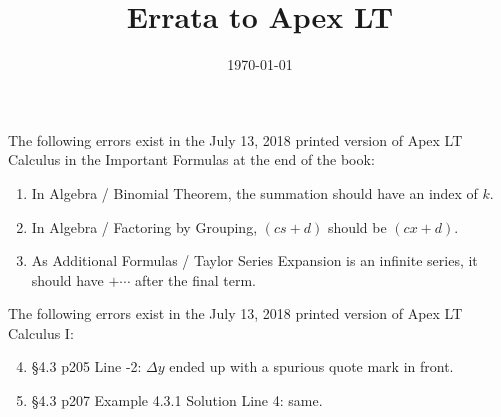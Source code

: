 \documentclass{amsart}
\title{Errata to Apex LT}
\date{\today}
\begin{document}
\vspace*{-.5in}

\maketitle

\noindent
The following errors exist in the July 13, 2018 printed version of Apex LT Calculus in the Important Formulas at the end of the book:
\begin{enumerate}
\item In Algebra / Binomial Theorem, the summation should have an index of $k$.
\item In Algebra / Factoring by Grouping, $(cs+d)$ should be $(cx+d)$.
\item As Additional Formulas / Taylor Series Expansion is an infinite series, it should have $+\dotsb$ after the final term.
\end{enumerate}\vspace{.5in}

The following errors exist in the July 13, 2018 printed version of Apex LT Calculus I:
\begin{enumerate}\setcounter{enumi}{3}
\item \S4.3 p205 Line -2: $\Delta y$ ended up with a spurious quote mark in front.
\item \S4.3 p207 Example 4.3.1 Solution Line 4: same.
\label{2018-07-13I}
\end{enumerate}\vspace{.5in}
\end{document}
